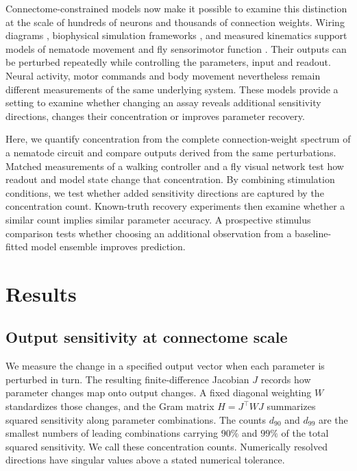 \documentclass[11pt,letterpaper]{article}
\begin{document}
Connectome-constrained models now make it possible to examine this distinction at the scale of hundreds of neurons and thousands of connection weights. Wiring diagrams \citep{white1986structure,cook2019connectome,dorkenwald2024flywire}, biophysical simulation frameworks \citep{hines1997neuron,szigeti2014openworm,gleeson2018c302}, and measured kinematics \citep{javer2018open,pereira2020quantifying} support models of nematode movement and fly sensorimotor function \citep{wang2025baaiworm,wangchen2024neuromechfly,lobatorios2022neuromechfly,lappalainen2024connectome}. Their outputs can be perturbed repeatedly while controlling the parameters, input and readout. Neural activity, motor commands and body movement nevertheless remain different measurements of the same underlying system. These models provide a setting to examine whether changing an assay reveals additional sensitivity directions, changes their concentration or improves parameter recovery.

Here, we quantify concentration from the complete connection-weight spectrum of a nematode circuit and compare outputs derived from the same perturbations. Matched measurements of a walking controller and a fly visual network test how readout and model state change that concentration. By combining stimulation conditions, we test whether added sensitivity directions are captured by the concentration count. Known-truth recovery experiments then examine whether a similar count implies similar parameter accuracy. A prospective stimulus comparison tests whether choosing an additional observation from a baseline-fitted model ensemble improves prediction.

\section*{Results}

\subsection*{Output sensitivity at connectome scale}
We measure the change in a specified output vector when each parameter is perturbed in turn. The resulting finite-difference Jacobian $J$ records how parameter changes map onto output changes. A fixed diagonal weighting $W$ standardizes those changes, and the Gram matrix $H=J^{\top}WJ$ summarizes squared sensitivity along parameter combinations. The counts $d_{90}$ and $d_{99}$ are the smallest numbers of leading combinations carrying $90\%$ and $99\%$ of the total squared sensitivity. We call these concentration counts. Numerically resolved directions have singular values above a stated numerical tolerance.
\end{document}
